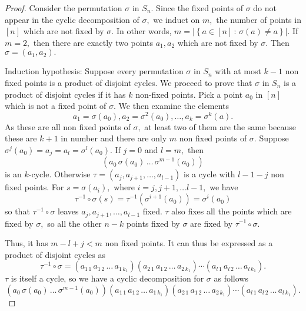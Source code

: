 \begin{proof}
	Consider the permutation $\sigma$ in $S_n.$
Since the fixed points of $\sigma$ do not appear in the cyclic decomposition of $\sigma,$
we induct on $m,$ the number of points in $ \left[ n \right] $ which are not fixed by $ \sigma.$
In other words, $ m = \lvert \left\{ a \in \left[ n \right] \, : \, \sigma(a) \not = a \right\}  \rvert .$
If $ m = 2,$ then there are exactly two points $a_1, a_2$ which are not fixed by $ \sigma.$
Then $\sigma = (a_1, a_2).$

Induction hypothesis:
Suppose every permutation $\sigma$ in $S_n$ with at most $k-1$ non fixed points
is a product of disjoint cycles.
We proceed to prove that $\sigma$ in $S_n$ is a product of disjoint cycles
if it has $k$ non-fixed points.
Pick a point $a_0$ in $ \left[ n \right] $ which is not a fixed point of $\sigma.$
We then examine the elements $$a_1 = \sigma(a_0), a_2 = \sigma^2(a_0), \dotsc, a_k = \sigma^k(a).$$
As these are all non fixed points of $\sigma,$ at least two of them are the same 
because these are $k+1$ in number and there are only $m$ non fixed points of 
$\sigma.$ Suppose $\sigma^j(a_0) = a_j = a_l = \sigma^l(a_0).$
If $j=0$ and $l=m,$ then 
$$ ( a_0 \, \sigma(a_0) \, \dotsc \, \sigma^{m-1}(a_0) )$$
is an $k$\nobreakdash-cycle.
Otherwise $ \tau = (a_j, a _{j+1}, \dotsc, a _{l-1})$ is a cycle with $l-1-j$
non fixed points.
For $s = \sigma(a_i),$ where $i=j, j+1, \dotsc l-1,$ we have
$$ \tau^{-1} \circ \sigma (s) = \tau^{-1}(\sigma^{i+1}(a_0)) = \sigma^i(a_0)$$
so that $\tau^{-1} \circ \sigma$ leaves $a_j, a _{j+1}, \dotsc, a_{l-1}$ fixed.
$\tau$ also fixes all the points which are fixed by $ \sigma,$ so all 
the other $n - k$ points fixed by $\sigma$ are fixed by $\tau^{-1} \circ \sigma.$

Thus, it has $m - l + j < m $ non fixed points.
It can thus be expressed as a product of disjoint cycles as
$$ \tau^{-1} \circ \sigma = 
(a_{1\, 1} \, a_{1\, 2} \, \dotsc \, a_{1 \, k_1} )
(a_{2\, 1} \, a_{1\, 2} \, \dotsc \, a_{2 \, k_1} )
\cdots
(a_{l\, 1} \, a_{l\, 2} \, \dotsc \, a_{l \, k_1} )
.$$
$\tau$ is itself a cycle, so we have a cyclic decomposition for $\sigma$
as follows
$$ ( a_0 \, \sigma(a_0) \, \dotsc \, \sigma^{m-1}(a_0) )
(a_{1\, 1} \, a_{1\, 2} \, \dotsc \, a_{1 \, k_1} )
(a_{2\, 1} \, a_{1\, 2} \, \dotsc \, a_{2 \, k_1} )
\cdots
(a_{l\, 1} \, a_{l\, 2} \, \dotsc \, a_{l \, k_1} ) . $$
\end{proof}

